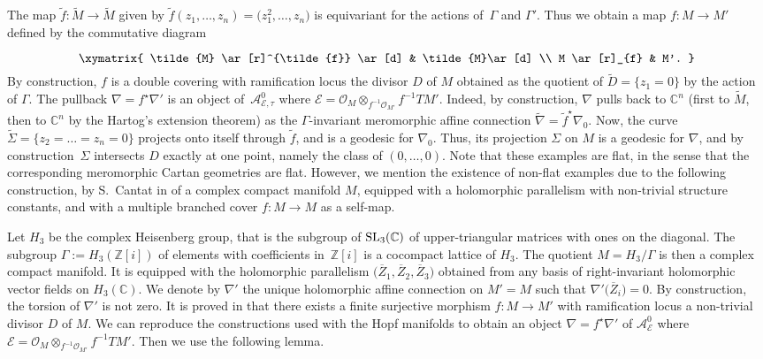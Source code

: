\documentclass[pdftex]{sigma}
\numberwithin{equation}{section}
\begin{document}
The map $\tilde{f}\colon \tilde{M} \longrightarrow \tilde{M}$ given by $\tilde{f}(z_1,\dots,z_n) =\big(z_1^2,\dots,z_n\big)$ is equivariant for the actions of~$\Gamma$ and $\Gamma'$. Thus we obtain a map $f\colon M\longrightarrow M'$ defined by the commutative diagram\vspace{-1.5mm}
 \begin{gather*}%
\xymatrix{ \tilde{M} \ar[r]^{\tilde{f}} \ar[d] & \tilde{M}\ar[d] \\ M \ar[r]_{f} & M'. }\vspace{-1.5mm}
\end{gather*}
By construction, $f$ is a double covering with ramification locus the divisor $D$ of $M$ obtained as the quotient of $\tilde{D}=\{z_1=0\}$ by the action of $\Gamma$. The pullback $\nabla=f^\star \nabla'$ is an object of~$\mathcal{A}^0_\mathcal{E,\tau}$ where $\mathcal{E}=\mathcal{O}_M\otimes_{f^{-1}\mathcal{O}_{M'}} f^{-1}TM'$. Indeed, by construction, $\nabla$ pulls back to $\mathbb{C}^n$ (first to $\tilde{M}$, then to $\mathbb{C}^n$ by the Hartog's extension theorem) as the $\Gamma$-invariant meromorphic affine connection $\tilde{\nabla} = \tilde{f}^\star \nabla_0$. Now, the curve $\tilde{\Sigma} =\{z_2 = \dots = z_n = 0\}$ projects onto itself through $\tilde{f}$, and is a geodesic for $\nabla_0$. Thus, its projection $\Sigma$ on $M$ is a geodesic for $\nabla$, and by construction~$\Sigma$ intersects $D$ exactly at one point, namely the class of $(0,\dots,0)$. Note that these examples are flat, in the sense that the corresponding meromorphic Cartan geometries are flat.
However, we mention the existence of non-flat examples due to the following construction, by S.~Cantat in \cite[Example 5.3]{Cantat} of a complex compact manifold $M$, equipped with a holomorphic parallelism with non-trivial structure constants, and with a multiple branched cover $f\colon M \longrightarrow M$ as a self-map.

 Let $H_3$ be the complex Heisenberg group, that is the subgroup of ${\rm SL}_3(\mathbb{C})$ of upper-triangular matrices with ones on the diagonal. The subgroup $\Gamma:=H_3(\mathbb{Z}[i])$ of elements with coefficients in~$\mathbb{Z}[i]$ is a cocompact lattice of $H_3$. The quotient $M=H_3/\Gamma$ is then a complex compact manifold. It is equipped with the holomorphic parallelism $\big(\overline{Z}_1,\overline{Z}_2,\overline{Z}_3\big)$ obtained from any basis of right-invariant holomorphic vector fields on $H_3(\mathbb{C})$. We denote by $\nabla'$ the unique holomorphic affine connection on $M'=M$ such that $\nabla'\big(\overline{Z}_i\big)=0$. By construction, the torsion of $\nabla'$ is not zero. It is proved in \cite[Example 5.3]{Cantat} that there exists a finite surjective morphism $f\colon M \longrightarrow M'$ with ramification locus a non-trivial divisor $D$ of $M$. We can reproduce the constructions used with the Hopf manifolds to obtain an object $\nabla=f^\star \nabla'$ of $\mathcal{A}^0_{\mathcal{E}}$ where $\mathcal{E}= \mathcal{O}_M\otimes_{f^{-1}\mathcal{O}_{M'}} f^{-1} TM'$. Then we use the following lemma.
\end{document}
